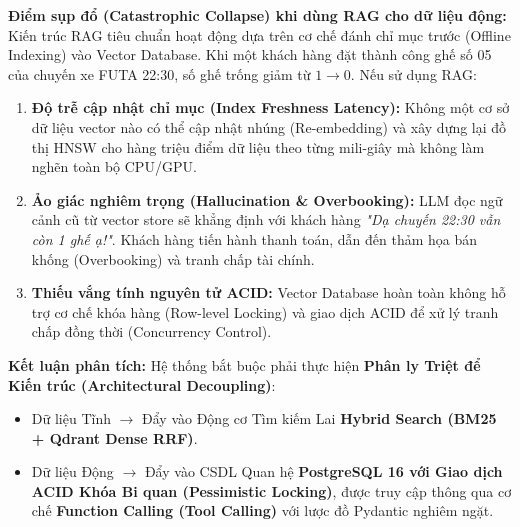 \textbf{Điểm sụp đổ (Catastrophic Collapse) khi dùng RAG cho dữ liệu động:} \\
Kiến trúc RAG tiêu chuẩn hoạt động dựa trên cơ chế đánh chỉ mục trước (Offline Indexing) vào Vector Database. Khi một khách hàng đặt thành công ghế số 05 của chuyến xe FUTA 22:30, số ghế trống giảm từ $1 \rightarrow 0$. Nếu sử dụng RAG:
\begin{enumerate}
    \item \textbf{Độ trễ cập nhật chỉ mục (Index Freshness Latency):} Không một cơ sở dữ liệu vector nào có thể cập nhật nhúng (Re-embedding) và xây dựng lại đồ thị HNSW cho hàng triệu điểm dữ liệu theo từng mili-giây mà không làm nghẽn toàn bộ CPU/GPU.
    \item \textbf{Ảo giác nghiêm trọng (Hallucination \& Overbooking):} LLM đọc ngữ cảnh cũ từ vector store sẽ khẳng định với khách hàng \textit{"Dạ chuyến 22:30 vẫn còn 1 ghế ạ!"}. Khách hàng tiến hành thanh toán, dẫn đến thảm họa bán khống (Overbooking) và tranh chấp tài chính.
    \item \textbf{Thiếu vắng tính nguyên tử ACID:} Vector Database hoàn toàn không hỗ trợ cơ chế khóa hàng (Row-level Locking) và giao dịch ACID để xử lý tranh chấp đồng thời (Concurrency Control).
\end{enumerate}

\textbf{Kết luận phân tích:} Hệ thống bắt buộc phải thực hiện \textbf{Phân ly Triệt để Kiến trúc (Architectural Decoupling)}:
\begin{itemize}
    \item Dữ liệu Tĩnh $\rightarrow$ Đẩy vào Động cơ Tìm kiếm Lai \textbf{Hybrid Search (BM25 + Qdrant Dense RRF)}.
    \item Dữ liệu Động $\rightarrow$ Đẩy vào CSDL Quan hệ \textbf{PostgreSQL 16 với Giao dịch ACID Khóa Bi quan (Pessimistic Locking)}, được truy cập thông qua cơ chế \textbf{Function Calling (Tool Calling)} với lược đồ Pydantic nghiêm ngặt.
\end{itemize}
